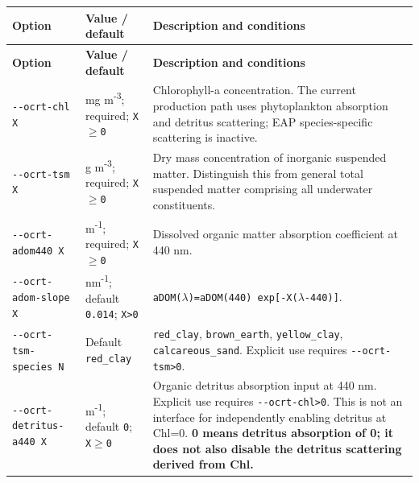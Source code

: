 {\TableFont
\begin{longtable}{@{}>{\raggedright\arraybackslash}p{}>{\raggedright\arraybackslash}p{}>{\raggedright\arraybackslash}p{}@{}}
\toprule
\textbf{Option} & \textbf{Value / default} & \textbf{Description and conditions} \\
\midrule
\endfirsthead
\toprule
\textbf{Option} & \textbf{Value / default} & \textbf{Description and conditions} \\
\midrule
\endhead
\bottomrule
\endfoot
\texttt{-\allowbreak{}-\allowbreak{}ocrt-\allowbreak{}chl X} & mg m\textsuperscript{-}\textsuperscript{3}; required; \texttt{X\ensuremath{\geq}0} & Chlorophyll-a concentration. The current production path uses phytoplankton absorption and detritus scattering; EAP species-specific scattering is inactive. \\
\texttt{-\allowbreak{}-\allowbreak{}ocrt-\allowbreak{}tsm X} & g m\textsuperscript{-}\textsuperscript{3}; required; \texttt{X\ensuremath{\geq}0} & Dry mass concentration of inorganic suspended matter. Distinguish this from general total suspended matter comprising all underwater constituents. \\
\texttt{-\allowbreak{}-\allowbreak{}ocrt-\allowbreak{}adom440 X} & m\textsuperscript{-}\textsuperscript{1}; required; \texttt{X\ensuremath{\geq}0} & Dissolved organic matter absorption coefficient at 440 nm. \\
\texttt{-\allowbreak{}-\allowbreak{}ocrt-\allowbreak{}adom-\allowbreak{}slope X} & nm\textsuperscript{-}\textsuperscript{1}; default \texttt{0.\allowbreak{}014}; \texttt{X>0} & \texttt{aDOM(\ensuremath{\lambda})=\allowbreak{}aDOM(440) exp[-\allowbreak{}X(\ensuremath{\lambda}-440)]}. \\
\texttt{-\allowbreak{}-\allowbreak{}ocrt-\allowbreak{}tsm-\allowbreak{}species N} & Default \texttt{red\_\allowbreak{}clay} & \texttt{red\_\allowbreak{}clay}, \texttt{brown\_\allowbreak{}earth}, \texttt{yellow\_\allowbreak{}clay}, \texttt{calcareous\_\allowbreak{}sand}. Explicit use requires \texttt{-\allowbreak{}-\allowbreak{}ocrt-\allowbreak{}tsm>0}. \\
\texttt{-\allowbreak{}-\allowbreak{}ocrt-\allowbreak{}detritus-\allowbreak{}a440 X} & m\textsuperscript{-}\textsuperscript{1}; default \texttt{0}; \texttt{X\ensuremath{\geq}0} & Organic detritus absorption input at 440 nm. Explicit use requires \texttt{-\allowbreak{}-\allowbreak{}ocrt-\allowbreak{}chl>0}. This is not an interface for independently enabling detritus at Chl=0. \textbf{0 means detritus absorption of 0; it does not also disable the detritus scattering derived from Chl.} \\

\end{longtable}}
